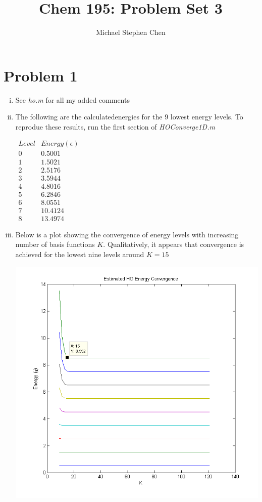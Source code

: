 \documentclass{article}
\title{Chem 195: Problem Set 3}
\author{Michael Stephen Chen}
\begin{document}
\maketitle
\pagebreak

\section*{Problem 1}
\begin{enumerate}[i.]
  \item See \textit{ho.m} for all my added comments
  \item The following are the calculatedenergies for the 9 lowest energy levels. To reprodue these results, run the first section of \textit{HOConverge1D.m}\\
    \begin{center}
    $\begin{array}{c|c}
      Level & Energy (\epsilon)  \\ \hline
      0 & 0.5001 \\
      1 & 1.5021 \\
      2 & 2.5176 \\
      3 & 3.5944 \\
      4 & 4.8016 \\
      5 & 6.2846 \\
      6 & 8.0551 \\
      7 & 10.4124\\
      8 & 13.4974
    \end{array}$\\
    \end{center}

  \item Below is a plot showing the convergence of energy levels with increasing number of basis functions $K$. Qualitatively, it appears that convergence is achieved for the lowest nine levels around $K=15$

    \begin{center}
      \includegraphics[scale=0.5]{prob1part3}
    \end{center}


\end{enumerate}
\end{document}
